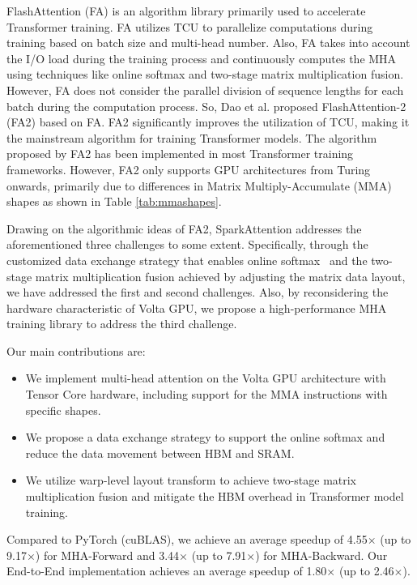 \documentclass[10pt,twocolumn]{article}
\begin{document}
FlashAttention (FA)\cite{dao2022flashattention} is an algorithm library primarily used to accelerate Transformer training. 
FA utilizes TCU\cite{tensor} to parallelize computations during training based on batch size and multi-head number.
Also, FA takes into account the I/O load during the training process and continuously computes the MHA using techniques like online softmax and two-stage matrix multiplication fusion.
However, FA does not consider the parallel division of sequence lengths for each batch during the computation process.
So, Dao et al. proposed FlashAttention-2 (FA2)\cite{dao2023flashattention} based on FA. 
FA2 significantly improves the utilization of TCU, making it the mainstream algorithm for training Transformer models.
The algorithm proposed by FA2 has been implemented in most Transformer training frameworks.
However, FA2 only supports GPU architectures from Turing onwards, primarily due to differences in Matrix Multiply-Accumulate (MMA)~\cite{mma} shapes as shown in Table \ref{tab:mmashapes}.

Drawing on the algorithmic ideas of FA2, SparkAttention addresses the aforementioned three challenges to some extent.
Specifically, through the customized data exchange strategy that enables online softmax~\cite{milakov2018online,rabe2021self,dao2022flashattention,dao2023flashattention,kitaev2020reformer} and the two-stage matrix multiplication fusion achieved by adjusting the matrix data layout, we have addressed the first and second challenges.
Also, by reconsidering the hardware characteristic of Volta GPU, we propose a high-performance MHA training library to address the third challenge.

Our main contributions are:
\begin{itemize} \small
\item We implement multi-head attention on the Volta GPU architecture with Tensor Core hardware, including support for the MMA instructions with specific shapes.
\item We propose a data exchange strategy to support the online softmax and reduce the data movement between HBM and SRAM.
\item We utilize warp-level layout transform to achieve two-stage matrix multiplication fusion and mitigate the HBM overhead in Transformer model training.
\end{itemize}

Compared to PyTorch\cite{pytorch} (cuBLAS\cite{cublas}), we achieve an average speedup of 4.55$\times$ (up to 9.17$\times$) for MHA-Forward and 3.44$\times$ (up to 7.91$\times$) for MHA-Backward. 
Our End-to-End implementation achieves an average speedup of 1.80$\times$ (up to 2.46$\times$).
\end{document}
